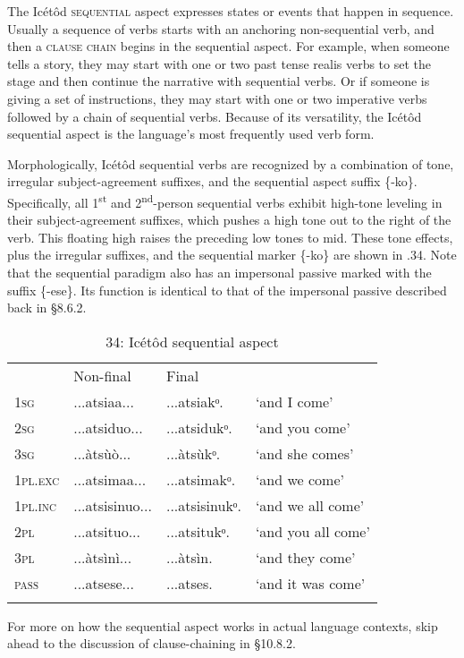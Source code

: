 The Icétôd \textsc{sequential} aspect expresses states or events that happen in sequence. Usually a sequence of verbs starts with an anchoring non-sequential verb, and then a \textsc{clause} \textsc{chain} begins in the sequential aspect. For example, when someone tells a story, they may start with one or two past tense realis verbs to set the stage and then continue the narrative with sequential verbs. Or if someone is giving a set of instructions, they may start with one or two imperative verbs followed by a chain of sequential verbs. Because of its versatility, the Icétôd sequential aspect is the language’s most frequently used verb form.

Morphologically, Icétôd sequential verbs are recognized by a combination of tone, irregular subject-agreement suffixes, and the sequential aspect suffix \{-ko\}. Specifically, all 1\textsuperscript{st} and 2\textsuperscript{nd}{}-person sequential verbs exhibit high-tone leveling in their subject-agreement suffixes, which pushes a high tone out to the right of the verb. This floating high raises the preceding low tones to mid. These tone effects, plus the irregular suffixes, and the sequential marker \{-ko\} are shown in .34. Note that the sequential paradigm also has an impersonal passive marked with the suffix \{-ese\}. Its function is identical to that of the impersonal passive described back in §8.6.2.


\begin{table}
\caption{34: Icétôd sequential aspect}
\label{tab:8}


\begin{tabularx}{\textwidth}{XXXX} & Non-final & Final & \\
\lsptoprule
\textsc{1sg} & ...atsiaa... & ...atsiakᵒ. & ‘and I come’\\
\textsc{2sg} & ...atsiduo... & ...atsidukᵒ. & ‘and you come’\\
\textsc{3sg} & ...àtsùò... & ...àtsùkᵒ. & ‘and she comes’\\
\textsc{1pl.exc} & ...atsimaa... & ...atsimakᵒ. & ‘and we come’\\
\textsc{1pl.inc} & ...atsisinuo... & ...atsisinukᵒ. & ‘and we all come’\\
\textsc{2pl} & ...atsituo... & ...atsitukᵒ. & ‘and you all come’\\
\textsc{3pl} & ...àtsìnì... & ...àtsìn. & ‘and they come’\\
\textsc{pass} & ...atsese... & ...atses. & ‘and it was come’\\
\lspbottomrule
\end{tabularx}
\end{table}
For more on how the sequential aspect works in actual language contexts, skip ahead to the discussion of clause-chaining in §10.8.2.


